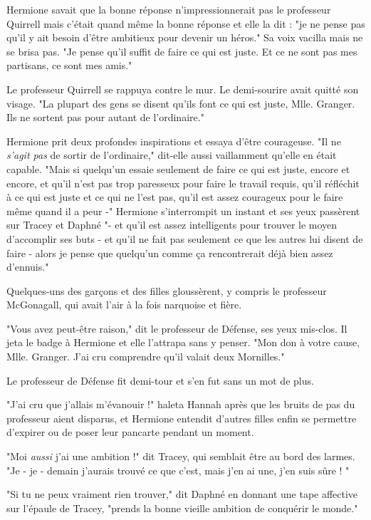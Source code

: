Hermione savait que la bonne réponse n'impressionnerait pas le professeur Quirrell mais c'était quand même la bonne réponse et elle la dit : "je ne pense pas qu'il y ait besoin d'être ambitieux pour devenir un héros." Sa voix vacilla mais ne se brisa pas. "Je pense qu'il suffit de faire ce qui est juste. Et ce ne sont pas mes partisans, ce sont mes amis."

Le professeur Quirrell se rappuya contre le mur. Le demi-sourire avait quitté son visage. "La plupart des gens se disent qu'ils font ce qui est juste, Mlle. Granger. Ils ne sortent pas pour autant de l'ordinaire."

Hermione prit deux profondes inspirations et essaya d'être courageuse. "Il ne \emph{s'agit pas}  de sortir de l'ordinaire," dit-elle aussi vaillamment qu'elle en était capable. "Mais si quelqu'un essaie seulement de faire ce qui est juste, encore et encore, et qu'il n'est pas trop paresseux pour faire le travail requis, qu'il réfléchit à ce qui est juste et ce qui ne l'est pas, qu'il est assez courageux pour le faire même quand il a peur -" Hermione s'interrompit un instant et ses yeux passèrent sur Tracey et Daphné "- et qu'il est assez intelligents pour trouver le moyen d'accomplir ses buts - et qu'il ne fait pas seulement ce que les autres lui disent de faire - alors je pense que quelqu'un comme ça rencontrerait déjà bien assez d'ennuis."

Quelques-uns des garçons et des filles gloussèrent, y compris le professeur McGonagall, qui avait l'air à la fois narquoise et fière.

"Vous avez peut-être raison," dit le professeur de Défense, ses yeux mis-clos. Il jeta le badge à Hermione et elle l'attrapa sans y penser. "Mon don à votre cause, Mlle. Granger. J'ai cru comprendre qu'il valait deux Mornilles."

Le professeur de Défense fit demi-tour et s'en fut sans un mot de plus.

"J'ai cru que j'allais m'évanouir !" haleta Hannah après que les bruits de pas du professeur aient disparus, et Hermione entendit d'autres filles enfin se permettre d'expirer ou de poser leur pancarte pendant un moment.

"Moi \emph{aussi}  j'ai une ambition !" dit Tracey, qui semblait être au bord des larmes. "Je - je - demain j'aurais trouvé ce que c'est, mais j'en ai une, j'en suis sûre ! "

"Si tu ne peux vraiment rien trouver," dit Daphné en donnant une tape affective sur l'épaule de Tracey, "prends la bonne vieille ambition de conquérir le monde."

